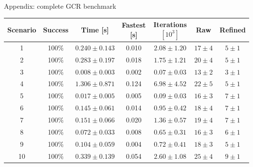 \documentclass[aspectratio=169,10pt]{beamer}
\begin{document}
\begin{frame}[t]{Appendix: complete GCR benchmark}
  \centering
  \scriptsize
  \renewcommand{\arraystretch}{1.08}
  \setlength{\tabcolsep}{3pt}
  \begin{tabular}{ccccccc}
    \toprule
    Scenario & Success & Time [s] & Fastest [s] &
      Iterations \([10^3]\) & Raw & Refined\\
    \midrule
    1 & 100\% & \(0.240\pm0.143\) & 0.010 & \(2.08\pm1.20\) & \(17\pm4\) & \(5\pm1\)\\
    2 & 100\% & \(0.283\pm0.197\) & 0.018 & \(1.75\pm1.21\) & \(20\pm4\) & \(5\pm1\)\\
    3 & 100\% & \(0.008\pm0.003\) & 0.002 & \(0.07\pm0.03\) & \(13\pm2\) & \(3\pm1\)\\
    4 & 100\% & \(1.306\pm0.871\) & 0.124 & \(6.98\pm4.52\) & \(22\pm5\) & \(5\pm1\)\\
    5 & 100\% & \(0.017\pm0.005\) & 0.005 & \(0.09\pm0.03\) & \(16\pm3\) & \(7\pm1\)\\
    6 & 100\% & \(0.145\pm0.061\) & 0.014 & \(0.95\pm0.42\) & \(18\pm4\) & \(7\pm1\)\\
    7 & 100\% & \(0.151\pm0.066\) & 0.020 & \(1.36\pm0.57\) & \(19\pm4\) & \(7\pm1\)\\
    8 & 100\% & \(0.072\pm0.033\) & 0.008 & \(0.65\pm0.31\) & \(16\pm3\) & \(6\pm1\)\\
    9 & 100\% & \(0.104\pm0.059\) & 0.004 & \(0.72\pm0.41\) & \(18\pm3\) & \(5\pm1\)\\
    10 & 100\% & \(0.339\pm0.139\) & 0.054 & \(2.60\pm1.08\) & \(25\pm4\) & \(9\pm1\)\\
    \bottomrule
  \end{tabular}

\end{frame}

\end{document}
